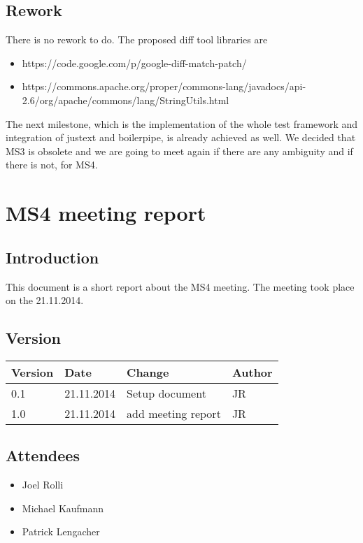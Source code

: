 \subsection{Rework}

There is no rework to do.
The proposed diff tool libraries are

\begin{itemize}
\item https://code.google.com/p/google-diff-match-patch/
\item https://commons.apache.org/proper/commons-lang/javadocs/api-2.6/org/apache/commons/lang/StringUtils.html
\end{itemize}


The next milestone, which is the implementation of the whole test framework and integration of justext and boilerpipe, is already achieved as well. We decided that MS3 is obsolete and we are going to meet again if there are any ambiguity and if there is not, for MS4.



\section{MS4 meeting report}

\label{ms4report}


\subsection{Introduction}

This document is a short report about the MS4 meeting. The meeting took place on the 21.11.2014.

\subsection{Version}


\begin{tabular}{| p{1.5cm} | p{2cm} | p{9cm} | p{1.5cm} |}
    \hline
    Version 	& Date      		& Change & Author 								\\ \hline
    0.1    		& 21.11.2014        & Setup document        				& JR 	\\ \hline
    1.0 		& 21.11.2014 		& add meeting report 					& JR 	\\ \hline
\end{tabular}


\subsection{Attendees}
\begin{itemize}
\item Joel Rolli
\item Michael Kaufmann
\item Patrick Lengacher
\end{itemize}

